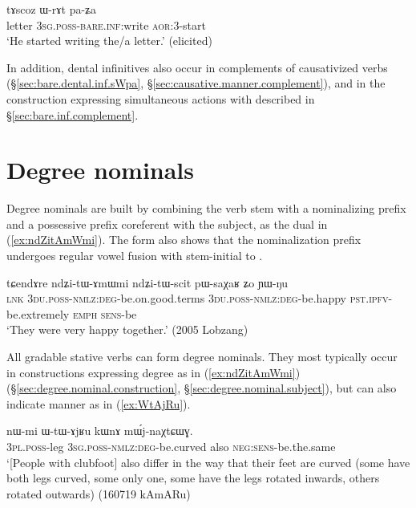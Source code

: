 \begin{exe}
\ex \label{ex:WrAt.paZa}
\gll tɤscoz ɯ-rɤt pa-ʑa \\
letter \textsc{3sg}.\textsc{poss}-\textsc{bare}.\textsc{inf:}write \textsc{aor}:3\flobv{}-start \\
\glt `He started writing the/a letter.' (elicited)
\end{exe}

In addition, dental infinitives also occur in complements of causativized verbs (§\ref{sec:bare.dental.inf.sWpa}, §\ref{sec:causative.manner.complement}), and in the construction expressing simultaneous actions with  described in §\ref{sec:bare.inf.complement}.

\section{Degree nominals} \label{sec:degree.nominals}

Degree nominals are built by combining the verb stem with a nominalizing  prefix and a possessive prefix coreferent with the subject, as the dual  in (\ref{ex:ndZitAmWmi}). The form  also shows that the nominalization  prefix undergoes regular vowel fusion with stem-initial  to . 

 \begin{exe}
\ex \label{ex:ndZitAmWmi}
\gll  tɕendɤre ndʑi-tɯ-ɤmɯmi ndʑi-tɯ-scit pɯ-saχaʁ ʑo ɲɯ-ŋu \\
 \textsc{lnk} \textsc{3du}.\textsc{poss}-\textsc{nmlz}:\textsc{deg}-be.on.good.terms \textsc{3du}.\textsc{poss}-\textsc{nmlz}:\textsc{deg}-be.happy \textsc{pst}.\textsc{ipfv}-be.extremely \textsc{emph} \textsc{sens}-be \\
 \glt `They were very happy together.' (2005 Lobzang)
\end{exe}

All gradable stative verbs can form degree nominals. They most typically occur in constructions expressing degree as in (\ref{ex:ndZitAmWmi}) (§\ref{sec:degree.nominal.construction}, §\ref{sec:degree.nominal.subject}), but can also indicate manner as in (\ref{ex:WtAjRu}).

 \begin{exe}
	\ex \label{ex:WtAjRu}
	\gll nɯ-mi ɯ-tɯ-ɤjʁu kɯnɤ mɯ́j-naχtɕɯɣ. \\
	\textsc{3pl}.\textsc{poss}-leg \textsc{3sg}.\textsc{poss}-\textsc{nmlz}:\textsc{deg}-be.curved also \textsc{neg}:\textsc{sens}-be.the.same \\
	\glt `[People with clubfoot] also differ in the way that their feet are curved (some have both legs curved, some only one, some have the legs rotated inwards, others rotated outwards) (160719 kAmARu) 
\end{exe}

